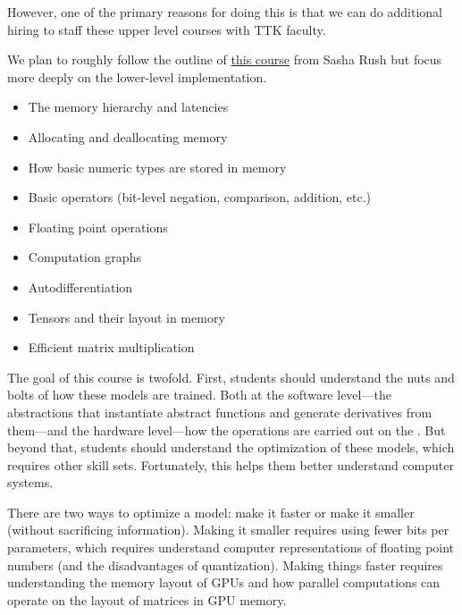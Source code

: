 However, one of the primary reasons for doing this is that we can do additional hiring to staff these upper level courses with TTK faculty.



We plan to roughly follow the outline of \href{https://minitorch.github.io/}{this course} from Sasha Rush but focus more deeply on the lower-level implementation.

\begin{itemize}
    \item The memory hierarchy and latencies 
    \item Allocating and deallocating memory
    \item How basic numeric types are stored in memory
    \item Basic operators (bit-level negation, comparison, addition, etc.)
    \item Floating point operations
    \item Computation graphs
    \item Autodifferentiation
    \item Tensors and their layout in memory
    \item Efficient matrix multiplication
\end{itemize}


The goal of this course is twofold.  First, students should understand the nuts and bolts of how these models are trained.  Both at the software level---the abstractions that instantiate abstract functions and generate derivatives from them---and the hardware level---how the operations are carried out on the .  But beyond that, students should understand the optimization of these models, which requires other skill sets.  Fortunately, this helps them better understand computer systems.

There are two ways to optimize a model: make it faster or make it smaller (without sacrificing information).  Making it smaller requires using fewer bits per parameters, which requires understand computer representations of floating point numbers (and the disadvantages of quantization).  Making things faster requires understanding the memory layout of GPUs and how parallel computations can operate on the layout of matrices in GPU memory.

